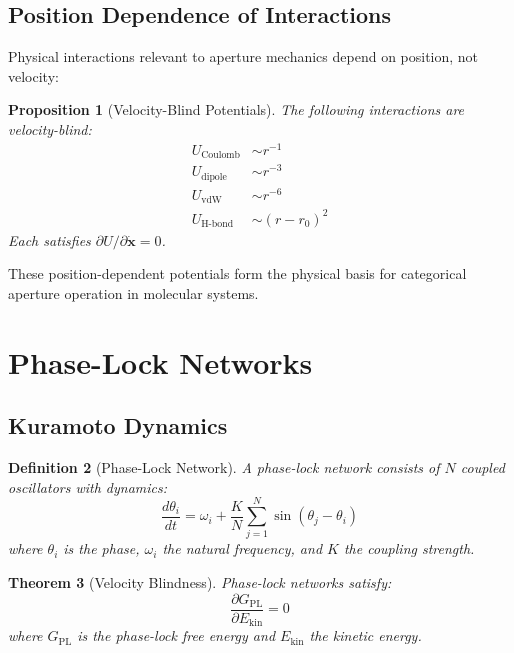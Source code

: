 \documentclass[twocolumn,amsmath,amssymb,aps,prl,superscriptaddress]{revtex4-2}
\newtheorem{theorem}{Theorem}[section]
\newtheorem{proposition}[theorem]{Proposition}
\newtheorem{definition}[theorem]{Definition}
\newcommand{\Gfree}{G_{\text{PL}}}
\newcommand{\Ekin}{E_{\text{kin}}}
\begin{document}
\subsection{Position Dependence of Interactions}

Physical interactions relevant to aperture mechanics depend on position, not velocity:

\begin{proposition}[Velocity-Blind Potentials]
The following interactions are velocity-blind:
\begin{align}
U_{\text{Coulomb}} &\sim r^{-1} \\
U_{\text{dipole}} &\sim r^{-3} \\
U_{\text{vdW}} &\sim r^{-6} \\
U_{\text{H-bond}} &\sim (r - r_0)^2
\end{align}
Each satisfies $\partial U / \partial \dot{\mathbf{x}} = 0$.
\end{proposition}

These position-dependent potentials form the physical basis for categorical aperture operation in molecular systems.

\section{Phase-Lock Networks}
\label{sec:phaselock}

\subsection{Kuramoto Dynamics}

\begin{definition}[Phase-Lock Network]
A phase-lock network consists of $N$ coupled oscillators with dynamics:
\begin{equation}
\frac{d\theta_i}{dt} = \omega_i + \frac{K}{N} \sum_{j=1}^{N} \sin(\theta_j - \theta_i)
\end{equation}
where $\theta_i$ is the phase, $\omega_i$ the natural frequency, and $K$ the coupling strength.
\end{definition}

\begin{theorem}[Velocity Blindness]
\label{thm:velblind}
Phase-lock networks satisfy:
\begin{equation}
\boxed{\frac{\partial \Gfree}{\partial \Ekin} = 0}
\end{equation}
where $\Gfree$ is the phase-lock free energy and $\Ekin$ the kinetic energy.
\end{theorem}
\end{document}
